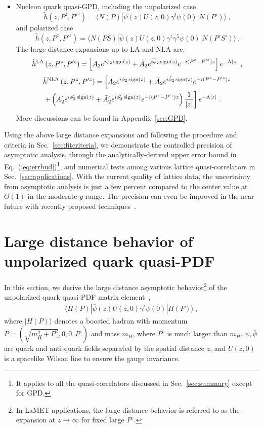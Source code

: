 \documentclass[a4paper,11pt]{article}
\begin{document}
\begin{itemize}
\item Nucleon quark quasi-GPD, including the unpolarized case $$\tilde{h}\left(z,P^z,P'^z\right)=\langle N(P) | \bar{\psi}(z) U(z,0) \gamma^t  \psi(0) | N(P') \rangle \ , $$ and polarized case $$\tilde{h}\left(z,P^z,P'^z\right)=\langle N(P S)| \bar{\psi}(z) U(z,0) \gamma^z \gamma^5 \psi(0) | N(P' S')\rangle \ .$$
The large distance expansions up to LA and NLA are, 
\begin{align}
\tilde{h}^{\rm LA}\left(z,P^z,P'^z\right) = 
\left[ A_2 e^{i \phi_2 \, {\rm sign}(z)} + \tilde{A}_2 e^{i \tilde{\phi}_2 \, {\rm sign}(z)} e^{-i(P^z-P'^z)z} \right] e^{-\Lambda |z|}  \ ,
\end{align}
\begin{align}
&\tilde{h}^{\rm NLA}\left(z,P^z,P'^z\right) = 
\left[ A_2 e^{i \phi_2 \, {\rm sign}(z)} + \tilde{A}_2 e^{i \tilde{\phi}_2 \, {\rm sign}(z)} e^{-i(P^z-P'^z)z} \right.\nonumber\\ 
&\left.+ \left( A'_2 e^{i \phi'_2 \, {\rm sign}(z)} + \tilde{A}'_2 e^{i \tilde{\phi}'_2 \, {\rm sign}(z)} e^{-i(P^z-P'^z)z} \right) \frac{1}{|z|}  \right] e^{-\Lambda |z|}  \ .
\end{align}
More discussions can be found in Appendix~\ref{sec:GPD}. 
\end{itemize}

Using the above large distance expansions and following the procedure and criteria in Sec.~\ref{sec:fitcriteria}, we demonstrate the controlled precision of asymptotic analysis, through the analytically-derived upper error bound in Eq.~(\ref{eq:errbud})\footnote{It applies to all the quasi-correlators discussed in Sec.~\ref{sec:summary} except for GPD.}, and numerical tests among various lattice quasi-correlators in Sec.~\ref{sec:applications}. With the current quality of lattice data, the uncertainty from asymptotic analysis is just a few percent compared to the center value at $O(1)$ in the moderate $y$ range. The precision can even be improved in the near future with recently proposed techniques~\cite{Gao:2023lny,Zhao:2023ptv,Zhang:2025hyo}. 


\section{Large distance behavior of unpolarized quark quasi-PDF}\label{sec:theory}
In this section, we derive the large distance asymptotic behavior\footnote{In LaMET applications, the large distance behavior is referred to as the expansion at $z \rightarrow \infty$ for fixed large $P^z$.} of the unpolarized quark quasi-PDF matrix element~\cite{Ji:2013dva,Ji:2014gla,Cichy:2018mum,Ji:2020ect,Ji:2024oka},
\begin{align}\label{eq:qPDF}
\langle H(P) | \bar{\psi}(z) U(z,0) \gamma^t \psi(0) | H(P) \rangle \ ,
\end{align}
where $| H(P) \rangle$ denotes a boosted hadron with momentum $P=\left(\sqrt{m_H^2+P_z^2},0,0,P^z\right)$ and mass $m_{H}$, where $P^z$ is much larger than $m_{H}$. $\psi,\bar{\psi}$ are quark and anti-quark fields separated by the spatial distance $z$, and $U(z,0)$ is a spacelike Wilson line to ensure the gauge invariance.
\end{document}
